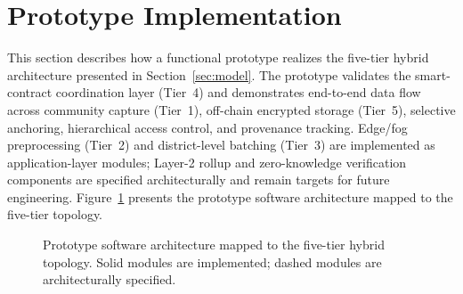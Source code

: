 \section{Prototype Implementation}\label{sec:implementation}

This section describes how a functional prototype realizes the five-tier hybrid architecture presented in Section~\ref{sec:model}. The prototype validates the smart-contract coordination layer (Tier~4) and demonstrates end-to-end data flow across community capture (Tier~1), off-chain encrypted storage (Tier~5), selective anchoring, hierarchical access control, and provenance tracking. Edge/fog preprocessing (Tier~2) and district-level batching (Tier~3) are implemented as application-layer modules; Layer-2 rollup and zero-knowledge verification components are specified architecturally and remain targets for future engineering. Figure~\ref{fig:proto_arch} presents the prototype software architecture mapped to the five-tier topology.

\begin{figure}[!ht]
\centering
{}
\caption{Prototype software architecture mapped to the five-tier hybrid topology. Solid modules are implemented; dashed modules are architecturally specified.}\label{fig:proto_arch}
\end{figure}

%
%
%
%
%
%
%

